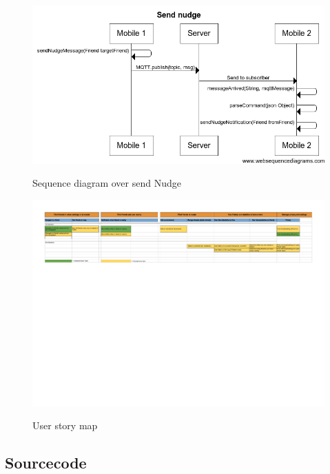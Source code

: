 \documentclass[runningheads,a4paper]{llncs}
\begin{document}
\begin{figure}
\centering
\caption{Sequence diagram over send Nudge}
\includegraphics[scale=0.5]{figures/sq-2}
\label{fig:sq-nudge}
\end{figure}


\begin{landscape}
\begin{figure}
\centering
\caption{User story map}
\includegraphics{figures/user_story_mapping}
\label{fig:user_story_mapping}
\end{figure}
\restoregeometry
\end{landscape}


\subsection*{Sourcecode}
\lstset{numbers=left,
tabsize=1, numbersep=10pt,
  title=\lstname }


\restoregeometry
\end{document}
